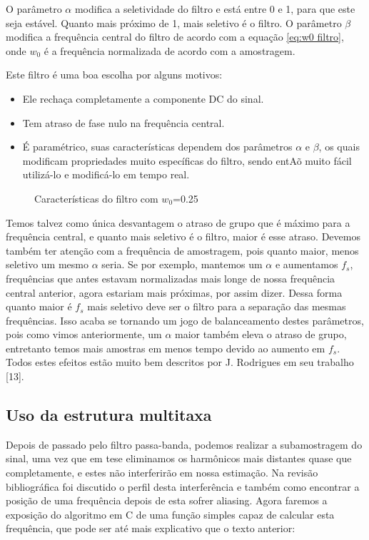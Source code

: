 \documentclass[a4paper, 12pt]{book}
\begin{document}
\indent O parâmetro $\alpha$ modifica a seletividade do filtro e está entre 0 e 1, para que este seja estável. Quanto mais próximo de 1, mais seletivo é o filtro. O parâmetro $\beta$ modifica a frequência central do filtro de acordo com a equação \ref{eq:w0 filtro}, onde $w_0$ é a frequência normalizada de acordo com a amostragem.

\indent Este filtro é uma boa escolha por alguns motivos:
\begin{itemize}
	\item Ele rechaça completamente a componente DC do sinal.
	\item Tem atraso de fase nulo na frequência central.
	\item É paramétrico, suas características dependem dos parâmetros $\alpha$ e $\beta$, os quais modificam propriedades muito específicas do filtro, sendo entAõ muito fácil utilizá-lo e modificá-lo em tempo real.
\end{itemize}

\begin{figure}[h]
	\centering    
	\def\svgwidth{\columnwidth}
	
	\caption{Características do filtro com $w_0$=0.25}
	\label{fig:your image label}
\end{figure}

\indent Temos talvez como única desvantagem o atraso de grupo que é máximo para a frequência central, e quanto mais seletivo é o filtro, maior é esse atraso. Devemos também ter atenção com a frequência de amostragem, pois quanto maior, menos seletivo um mesmo $\alpha$ seria. Se por exemplo, mantemos um $\alpha$ e aumentamos $f_s$, frequências que antes estavam normalizadas mais longe de nossa frequência central anterior, agora estariam mais próximas, por assim dizer. Dessa forma quanto maior é $f_s$ mais seletivo deve ser o filtro para a separação das mesmas frequências. Isso acaba se tornando um jogo de balanceamento destes parâmetros, pois como vimos anteriormente, um $\alpha$ maior também eleva o atraso de grupo, entretanto temos mais amostras em menos tempo devido ao aumento em $f_s$. Todos estes efeitos estão muito bem descritos por J. Rodrigues em seu trabalho [13].

\subsection{Uso da estrutura multitaxa}

Depois de passado pelo filtro passa-banda, podemos realizar a subamostragem do sinal, uma vez que em tese eliminamos os harmônicos mais distantes quase que completamente, e estes não interferirão em nossa estimação. Na revisão bibliográfica foi discutido o perfil desta interferência e também como encontrar a posição de uma frequência depois de esta sofrer aliasing. Agora faremos a exposição do algoritmo em C de uma função simples capaz de calcular esta frequência, que pode ser até mais explicativo que o texto anterior:
\end{document}

